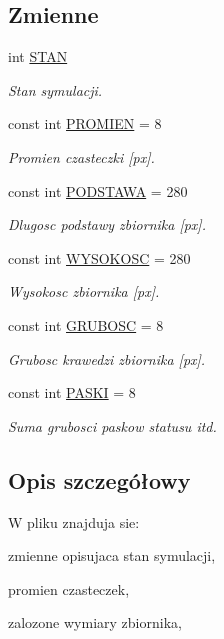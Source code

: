 \subsection*{Zmienne}
\begin{DoxyCompactItemize}
\item 
int \hyperlink{flagi_8hh_ae3a120c63186a17e4127a68187b3e9e8}{S\+T\+A\+N}
\begin{DoxyCompactList}\small\item\em Stan symulacji. \end{DoxyCompactList}\item 
const int \hyperlink{flagi_8hh_aa77f856f3142a9e81752665a9bc2e6de}{P\+R\+O\+M\+I\+E\+N} = 8
\begin{DoxyCompactList}\small\item\em Promien czasteczki \mbox{[}px\mbox{]}. \end{DoxyCompactList}\item 
const int \hyperlink{flagi_8hh_acd3c5814c051e565bf7854f6403acf49}{P\+O\+D\+S\+T\+A\+W\+A} = 280
\begin{DoxyCompactList}\small\item\em Dlugosc podstawy zbiornika \mbox{[}px\mbox{]}. \end{DoxyCompactList}\item 
const int \hyperlink{flagi_8hh_a073767f0ac7dbf009a42b00de1092b52}{W\+Y\+S\+O\+K\+O\+S\+C} = 280
\begin{DoxyCompactList}\small\item\em Wysokosc zbiornika \mbox{[}px\mbox{]}. \end{DoxyCompactList}\item 
const int \hyperlink{flagi_8hh_a359a95636f17b8e9b7a01389d75b521d}{G\+R\+U\+B\+O\+S\+C} = 8
\begin{DoxyCompactList}\small\item\em Grubosc krawedzi zbiornika \mbox{[}px\mbox{]}. \end{DoxyCompactList}\item 
const int \hyperlink{flagi_8hh_afa380d01dc08ee237b4eea9046704397}{P\+A\+S\+K\+I} = 8
\begin{DoxyCompactList}\small\item\em Suma grubosci paskow statusu itd. \end{DoxyCompactList}\end{DoxyCompactItemize}


\subsection{Opis szczegółowy}
W pliku znajduja sie\+:
\begin{DoxyItemize}
\item zmienne opisujaca stan symulacji,
\item promien czasteczek,
\item zalozone wymiary zbiornika, 
\end{DoxyItemize}

